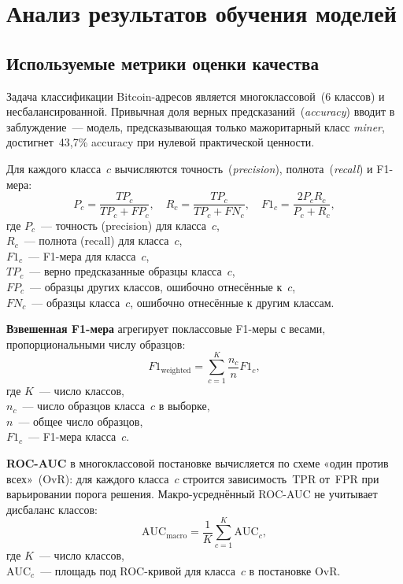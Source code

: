 \section{Анализ результатов обучения моделей}

\subsection{Используемые метрики оценки качества}

Задача классификации Bitcoin-адресов является многоклассовой~(6 классов) и несбалансированной. Привычная доля верных предсказаний~(\textit{accuracy}) вводит в заблуждение~--- модель, предсказывающая только мажоритарный класс \textit{miner}, достигнет~43,7\% accuracy при нулевой практической ценности.

Для каждого класса~$c$ вычисляются точность~(\textit{precision}), полнота~(\textit{recall}) и F1-мера:
\begin{equation}\label{eq:f1_class}
    P_c = \frac{TP_c}{TP_c + FP_c}, \quad
    R_c = \frac{TP_c}{TP_c + FN_c}, \quad
    F1_c = \frac{2 P_c R_c}{P_c + R_c},
\end{equation}
где $P_c$~--- точность (precision) для класса~$c$, \\ $R_c$~--- полнота (recall) для класса~$c$, \\ $F1_c$~--- F1-мера для класса~$c$, \\ $TP_c$~--- верно предсказанные образцы класса~$c$, \\ $FP_c$~--- образцы других классов, ошибочно отнесённые к~$c$, \\ $FN_c$~--- образцы класса~$c$, ошибочно отнесённые к другим классам.

\textbf{Взвешенная F1-мера} агрегирует поклассовые F1-меры с весами, пропорциональными числу образцов:
\begin{equation}\label{eq:f1_weighted}
    F1_{\text{weighted}} = \sum_{c=1}^{K} \frac{n_c}{n} F1_c,
\end{equation}
где $K$~--- число классов, \\ $n_c$~--- число образцов класса~$c$ в выборке, \\ $n$~--- общее число образцов, \\ $F1_c$~--- F1-мера класса~$c$.

\textbf{ROC-AUC} в многоклассовой постановке вычисляется по схеме «один против всех»~(OvR): для каждого класса~$c$ строится зависимость~TPR от~FPR при варьировании порога решения. Макро-усреднённый ROC-AUC не учитывает дисбаланс классов:
\begin{equation}\label{eq:roc_auc}
    \text{AUC}_{\text{macro}} = \frac{1}{K} \sum_{c=1}^{K} \text{AUC}_c,
\end{equation}
где $K$~--- число классов, \\ $\text{AUC}_c$~--- площадь под ROC-кривой для класса~$c$ в постановке OvR.

